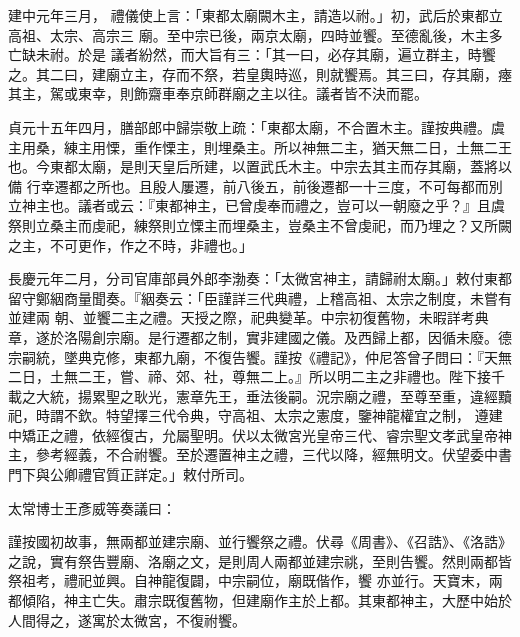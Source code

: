 
\begin{pinyinscope}

 建中元年三月，
 禮儀使上言：「東都太廟闕木主，請造以祔。」初，武后於東都立高祖、太宗、高宗三
 廟。至中宗已後，兩京太廟，四時並饗。至德亂後，木主多亡缺未祔。於是
 議者紛然，而大旨有三：「其一曰，必存其廟，遍立群主，時饗之。其二曰，建廟立主，存而不祭，若皇輿時巡，則就饗焉。其三曰，存其廟，瘞其主，駕或東幸，則飾齋車奉京師群廟之主以往。議者皆不決而罷。



 貞元十五年四月，膳部郎中歸崇敬上疏：「東都太廟，不合置木主。謹按典禮。虞主用桑，練主用慄，重作慄主，則埋桑主。所以神無二主，猶天無二日，土無二王也。今東都太廟，是則天皇后所建，以置武氏木主。中宗去其主而存其廟，蓋將以備
 行幸遷都之所也。且殷人屢遷，前八後五，前後遷都一十三度，不可每都而別立神主也。議者或云：『東都神主，已曾虔奉而禮之，豈可以一朝廢之乎？』且虞祭則立桑主而虔祀，練祭則立慄主而埋桑主，豈桑主不曾虔祀，而乃埋之？又所闕之主，不可更作，作之不時，非禮也。」



 長慶元年二月，分司官庫部員外郎李渤奏：「太微宮神主，請歸祔太廟。」敕付東都留守鄭絪商量聞奏。『絪奏云：「臣謹詳三代典禮，上稽高祖、太宗之制度，未嘗有並建兩
 朝、並饗二主之禮。天授之際，祀典變革。中宗初復舊物，未暇詳考典章，遂於洛陽創宗廟。是行遷都之制，實非建國之儀。及西歸上都，因循未廢。德宗嗣統，墜典克修，東都九廟，不復告饗。謹按《禮記》，仲尼答曾子問曰：『天無二日，土無二王，嘗、禘、郊、社，尊無二上。』所以明二主之非禮也。陛下接千載之大統，揚累聖之耿光，憲章先王，垂法後嗣。況宗廟之禮，至尊至重，違經黷祀，時謂不欽。特望擇三代令典，守高祖、太宗之憲度，鑒神龍權宜之制，
 遵建中矯正之禮，依經復古，允屬聖明。伏以太微宮光皇帝三代、睿宗聖文孝武皇帝神主，參考經義，不合祔饗。至於遷置神主之禮，三代以降，經無明文。伏望委中書門下與公卿禮官質正詳定。」敕付所司。



 太常博士王彥威等奏議曰：



 謹按國初故事，無兩都並建宗廟、並行饗祭之禮。伏尋《周書》、《召誥》、《洛誥》之說，實有祭告豐廟、洛廟之文，是則周人兩都並建宗祧，至則告饗。然則兩都皆祭祖考，禮祀並興。自神龍復闢，中宗嗣位，廟既偕作，饗
 亦並行。天寶末，兩都傾陷，神主亡失。肅宗既復舊物，但建廟作主於上都。其東都神主，大歷中始於人間得之，遂寓於太微宮，不復祔饗。




\end{pinyinscope}
